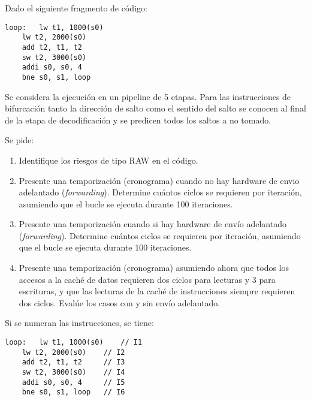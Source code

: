 \begin{acexercise}\end{acexercise}
\label{ex:m4-01:instr-01}

Dado el siguiente fragmento de código:

\begin{lstlisting}[language=generalasm2]
loop: 	lw t1, 1000(s0)
	lw t2, 2000(s0)
	add t2, t1, t2
	sw t2, 3000(s0)
	addi s0, s0, 4
	bne s0, s1, loop
\end{lstlisting}

Se considera la ejecución en un pipeline de 5 etapas.
Para las instrucciones de bifurcación tanto la dirección de salto como el
sentido del salto se conocen al final de la etapa de decodificación y se
predicen todos los saltos a no tomado.

Se pide:
\begin{enumerate}
  \item Identifique los riesgos de tipo RAW en el código.

  \item Presente una temporización (cronograma) cuando no hay hardware de envio adelantado
        (\emph{forwarding}). Determine cuántos ciclos se requieren por iteración,
        asumiendo que el bucle se ejecuta durante 100 iteraciones.

  \item Presente una temporización cuando si hay hardware de envío adelantado
        (\emph{forwarding}). Determine cuántos ciclos se requieren por iteración,
        asumiendo que el bucle se ejecuta durante 100 iteraciones.

  \item Presente una temporización (cronograma) asumiendo ahora que todos los accesos 
        a la caché de datos requieren dos ciclos para lecturas y 3 para escrituras,
        y que las lecturas de la caché de instrucciones siempre requieren dos ciclos.
        Evalúe los casos con y sin envío adelantado.
\end{enumerate}


\begin{acsolution}\end{acsolution}

Si se numeran las instrucciones, se tiene:

\begin{lstlisting}[language=generalasm2]
loop: 	lw t1, 1000(s0)    // I1
	lw t2, 2000(s0)    // I2
	add t2, t1, t2     // I3
	sw t2, 3000(s0)    // I4
	addi s0, s0, 4     // I5
	bne s0, s1, loop   // I6
\end{lstlisting}

